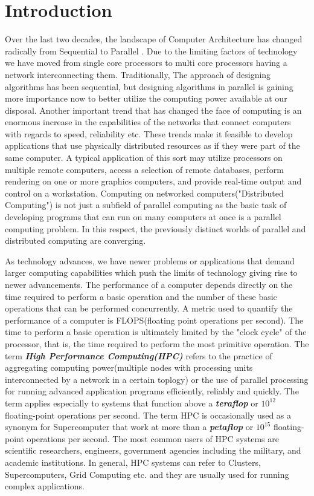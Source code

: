 \chapter{Introduction}\label{chapter:introduction}
Over the last two decades, the landscape of Computer Architecture has changed radically from Sequential to Parallel . Due to the limiting factors of technology we have moved from single core processors to multi core processors having a network interconnecting them. Traditionally, The approach of designing algorithms has been sequential, but designing algorithms in parallel is gaining more importance now to better utilize the computing power available at our disposal. Another important trend that has changed the face of computing is an enormous increase in the capabilities of the networks that connect computers with regards to speed, reliability etc. These trends make it feasible to develop applications that use physically distributed resources as if they were part of the same computer. A typical application of this sort may utilize processors on multiple remote computers, access a selection of remote databases, perform rendering on one or more graphics computers, and provide real-time output and control on a workstation. Computing on networked computers("Distributed Computing") is not just a subfield of parallel computing as the basic task of developing programs that can run on many computers at once is a parallel computing problem. In this respect, the previously distinct worlds of parallel and distributed computing are converging.\\ \par
\noindent
As technology advances, we have newer problems or applications that demand larger computing capabilities which push the limits of technology giving rise to newer advancements. The performance of a computer depends directly on the time required to perform a basic operation and the number of these basic operations that can be performed concurrently. A metric used to quantify the performance of a computer is FLOPS(floating point operations per second). The time to perform a basic operation is ultimately limited by the "clock cycle" of the processor, that is, the time required to perform the most primitive operation. The term \textbf{\textit{High Performance Computing(HPC)}} refers to the practice of aggregating computing power(multiple nodes with processing units interconnected by a network in a certain toplogy) or the use of parallel processing for running advanced application programs efficiently, reliably and quickly. The term applies especially to systems that function above a \textbf{\textit{teraflop}} or \textbf{\textit{$10^{12}$}} floating-point operations per second. The term HPC is occasionally used as a synonym for Supercomputer that work at more than a \textbf{\textit{petaflop}} or \textbf{\textit{$10^{15}$}} floating-point operations per second. The most common users of HPC systems are scientific researchers, engineers, government agencies including the military, and academic institutions. In general, HPC systems can refer to Clusters, Supercomputers, Grid Computing etc. and they are usually used for running complex applications.\\ \par
